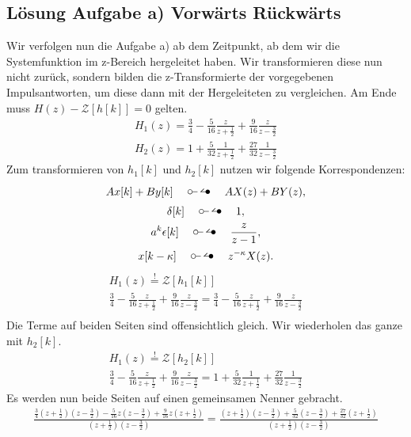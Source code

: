 \documentclass[11pt,a4paper,DIV=12]{scrartcl}
\begin{document}
\subsection*{Lösung Aufgabe a) Vorwärts Rückwärts}
Wir verfolgen nun die Aufgabe a) ab dem Zeitpunkt, ab dem wir die Systemfunktion im z-Bereich hergeleitet haben. Wir transformieren diese nun nicht zurück, sondern bilden die z-Transformierte der vorgegebenen Impulsantworten, um diese dann mit der Hergeleiteten zu vergleichen. Am Ende muss $H(z)-\mathcal{Z}[h[k]]=0$ gelten.
\begin{gather}
	H_1(z)=\frac{3}{4}-\frac{5}{16}\frac{z}{z+\frac{1}{2}}+\frac{9}{16}\frac{z}{z-\frac{3}{2}}\\
	H_2(z)=1+\frac{5}{32}\frac{1}{z+\frac{1}{2}}+\frac{27}{32}\frac{1}{z-\frac{3}{2}}
\end{gather}
Zum transformieren von $h_1[k]$ und $h_2[k]$ nutzen wir folgende Korrespondenzen:
\begin{gather}
	Ax[k]+By[k]\quad\ztransf\quad AX(z)+BY(z),\\
	\delta[k]\quad\ztransf\quad 1,\\
	a^k\epsilon[k]\quad\ztransf\quad \frac{z}{z-1},\\
	x[k-\kappa]\quad\ztransf\quad z^{-\kappa}X(z).
\end{gather}
\begin{gather}
	H_1(z)\overset{!}{=}\mathcal{Z}\left[h_1[k]\right]\\
	\frac{3}{4}-\frac{5}{16}\frac{z}{z+\frac{1}{2}}+\frac{9}{16}\frac{z}{z-\frac{3}{2}}=\frac{3}{4}-\frac{5}{16}\frac{z}{z+\frac{1}{2}}+\frac{9}{16}\frac{z}{z-\frac{3}{2}}\\
\end{gather}
Die Terme auf beiden Seiten sind offensichtlich gleich. Wir wiederholen das ganze mit $h_2[k]$.
\begin{gather}
	H_1(z)\overset{!}{=}\mathcal{Z}\left[h_2[k]\right]\\
	\frac{3}{4}-\frac{5}{16}\frac{z}{z+\frac{1}{2}}+\frac{9}{16}\frac{z}{z-\frac{3}{2}}=1+\frac{5}{32}\frac{1}{z+\frac{1}{2}}+\frac{27}{32}\frac{1}{z-\frac{3}{2}}
\end{gather}
Es werden nun beide Seiten auf einen gemeinsamen Nenner gebracht.
\begin{gather}
	\frac{\frac{3}{4}(z+\frac{1}{2})(z-\frac{3}{2})-\frac{5}{16}z(z-\frac{3}{2})+\frac{9}{16}z(z+\frac{1}{2})}{(z+\frac{1}{2})(z-\frac{3}{2})}=\frac{(z+\frac{1}{2})(z-\frac{3}{2})+\frac{5}{32}(z-\frac{3}{2})+\frac{27}{32}(z+\frac{1}{2})}{(z+\frac{1}{2})(z-\frac{3}{2})}
\end{gather}
\end{document}

